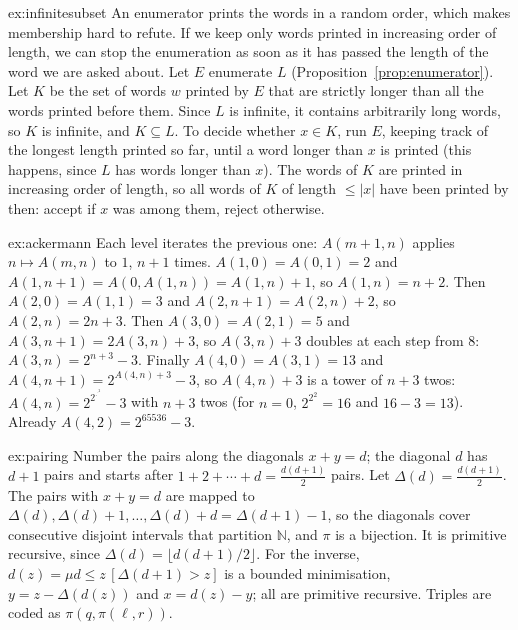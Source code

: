 \begin{solution}{ex:infinitesubset}
\idea An enumerator prints the words in a random order, which makes membership hard to refute. If we keep only words printed in increasing order of length, we can stop the enumeration as soon as it has passed the length of the word we are asked about.
\writeup Let $E$ enumerate $L$ (Proposition~\ref{prop:enumerator}). Let $K$ be the set of words $w$ printed by $E$ that are strictly longer than all the words printed before them. Since $L$ is infinite, it contains arbitrarily long words, so $K$ is infinite, and $K\subseteq L$. To decide whether $x\in K$, run $E$, keeping track of the longest length printed so far, until a word longer than $x$ is printed (this happens, since $L$ has words longer than $x$). The words of $K$ are printed in increasing order of length, so all words of $K$ of length $\le|x|$ have been printed by then: accept if $x$ was among them, reject otherwise.
\end{solution}

\begin{solution}{ex:ackermann}
\idea Each level iterates the previous one: $A(m+1,n)$ applies $n\mapsto A(m,n)$ to $1$, $n+1$ times.
\writeup $A(1,0)=A(0,1)=2$ and $A(1,n+1)=A(0,A(1,n))=A(1,n)+1$, so $A(1,n)=n+2$. Then $A(2,0)=A(1,1)=3$ and $A(2,n+1)=A(2,n)+2$, so $A(2,n)=2n+3$. Then $A(3,0)=A(2,1)=5$ and $A(3,n+1)=2A(3,n)+3$, so $A(3,n)+3$ doubles at each step from $8$: $A(3,n)=2^{n+3}-3$. Finally $A(4,0)=A(3,1)=13$ and $A(4,n+1)=2^{A(4,n)+3}-3$, so $A(4,n)+3$ is a tower of $n+3$ twos: $A(4,n)=2^{2^{\cdot^{\cdot^{2}}}}-3$ with $n+3$ twos (for $n=0$, $2^{2^2}=16$ and $16-3=13$). Already $A(4,2)=2^{65536}-3$.
\end{solution}

\begin{solution}{ex:pairing}
\idea Number the pairs along the diagonals $x+y=d$; the diagonal $d$ has $d+1$ pairs and starts after $1+2+\cdots+d=\frac{d(d+1)}2$ pairs.
\writeup Let $\Delta(d)=\frac{d(d+1)}2$. The pairs with $x+y=d$ are mapped to $\Delta(d),\Delta(d)+1,\dots,\Delta(d)+d=\Delta(d+1)-1$, so the diagonals cover consecutive disjoint intervals that partition $\mathbb N$, and $\pi$ is a bijection. It is primitive recursive, since $\Delta(d)=\lfloor d(d+1)/2\rfloor$. For the inverse, $d(z)=\mu d\le z\,[\Delta(d+1)>z]$ is a bounded minimisation, $y=z-\Delta(d(z))$ and $x=d(z)-y$; all are primitive recursive. Triples are coded as $\pi(q,\pi(\ell,r))$.
\end{solution}

